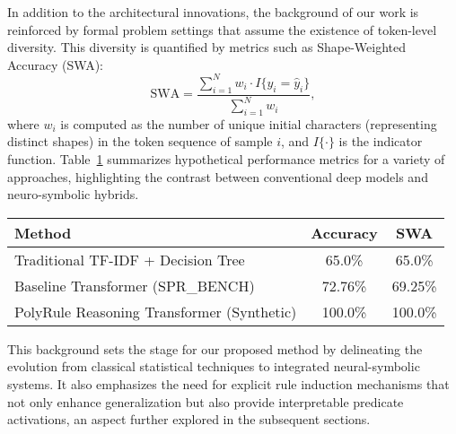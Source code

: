 \documentclass{article}
\begin{document}
In addition to the architectural innovations, the background of our work is reinforced by formal problem settings that assume the existence of token-level diversity. This diversity is quantified by metrics such as Shape-Weighted Accuracy (SWA):
\[
\text{SWA} = \frac{\sum_{i=1}^{N} w_i \cdot I\{y_i = \hat{y}_i\}}{\sum_{i=1}^{N} w_i},
\]
where \( w_i \) is computed as the number of unique initial characters (representing distinct shapes) in the token sequence of sample \( i \), and \( I\{ \cdot \} \) is the indicator function. Table~\ref{tab:background} summarizes hypothetical performance metrics for a variety of approaches, highlighting the contrast between conventional deep models and neuro-symbolic hybrids.

\begin{table}[h]
\centering
\begin{tabular}{|l|c|c|}
\hline
\textbf{Method} & \textbf{Accuracy} & \textbf{SWA} \\
\hline
Traditional TF-IDF + Decision Tree & 65.0\% & 65.0\% \\
Baseline Transformer (SPR\_BENCH) & 72.76\% & 69.25\% \\
PolyRule Reasoning Transformer (Synthetic) & 100.0\% & 100.0\% \\
\hline
\end{tabular}
\label{tab:background}
\end{table}

This background sets the stage for our proposed method by delineating the evolution from classical statistical techniques to integrated neural-symbolic systems. It also emphasizes the need for explicit rule induction mechanisms that not only enhance generalization but also provide interpretable predicate activations, an aspect further explored in the subsequent sections.
\end{document}
